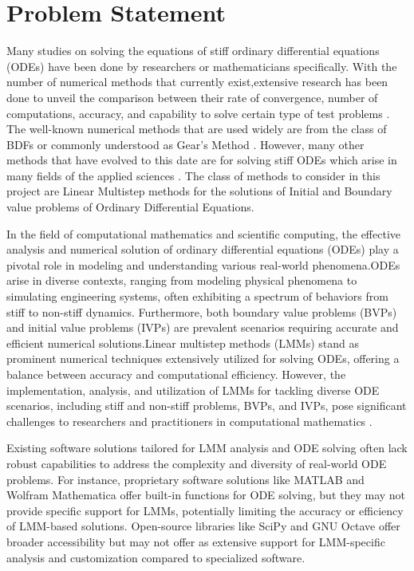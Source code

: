\documentclass[a4paper, twoside]{report} %
\begin{document}
	\section{Problem Statement}

	Many studies on solving the equations of stiff ordinary differential equations (ODEs) have been done by researchers or mathematicians specifically. With the number of numerical methods that currently exist,extensive research has been done to unveil the comparison between their rate of convergence, number of computations, accuracy, and capability to solve certain type of test problems \cite{Enright1975} . The well-known numerical methods that are used widely are from the class of BDFs or commonly understood as Gear’s Method \cite{BYRNE1977125}.
	However, many other methods that have evolved to this date are for solving stiff ODEs which arise in many fields of the applied sciences \cite{Yatim2013}. The class of methods to consider in this project are Linear Multistep methods for the solutions of Initial and Boundary value problems of Ordinary Differential Equations.

	In the field of computational mathematics and scientific computing, the effective analysis and numerical solution of ordinary differential equations (ODEs) play a pivotal role in modeling and understanding various real-world phenomena.ODEs arise in diverse contexts, ranging from modeling physical phenomena to simulating engineering systems, often exhibiting a spectrum of behaviors from stiff to non-stiff dynamics. Furthermore, both boundary value problems (BVPs) and initial value problems (IVPs) are prevalent scenarios requiring accurate and efficient numerical solutions.Linear multistep methods (LMMs) stand as prominent numerical techniques extensively utilized for solving ODEs, offering a balance between accuracy and computational efficiency. However, the implementation, analysis, and utilization of LMMs for tackling diverse ODE scenarios, including stiff and non-stiff problems, BVPs, and IVPs, pose significant challenges to researchers and practitioners in computational mathematics \cite{BUTCHER20091834}.

	Existing software solutions tailored for LMM analysis and ODE solving often lack robust capabilities to address the complexity and diversity of real-world ODE problems. For instance, proprietary software solutions like MATLAB and Wolfram Mathematica offer built-in functions for ODE solving, but they may not provide specific support for LMMs, potentially limiting the accuracy or efficiency of LMM-based solutions. Open-source libraries like SciPy and GNU Octave offer broader accessibility but may not offer as extensive support for LMM-specific analysis and customization compared to specialized software.
\end{document}
